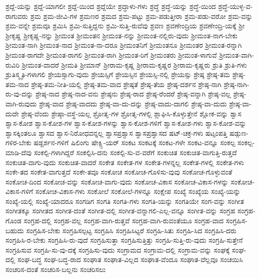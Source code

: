 {ಶ್ರದ್ದೆ-ಯನ್ನು
ಶ್ರದ್ದೆ-ಯಾಗಲೀ
ಶ್ರದ್ದೆ-ಯಿಂದ
ಶ್ರದ್ದೆಯೇ
ಶ್ರದ್ಧಾಳು-ಗಳು
ಶ್ರದ್ಧೆ
ಶ್ರದ್ಧೆ-ಯನ್ನು
ಶ್ರದ್ಧೆ-ಯಿಂದ
ಶ್ರದ್ಧೆ-ಯುಳ್ಳ-ವ-ರಾಗುವರು
ಶ್ರಮ
ಶ್ರಮ-ಜೀವಿ-ಗಳ
ಶ್ರಮಣರ
ಶ್ರಮದ
ಶ್ರಮ-ಪಟ್ಟು
ಶ್ರಮ-ಪಡುತ್ತೀರಾ
ಶ್ರಮ-ಪಡು-ವರೋ
ಶ್ರಮ-ವನ್ನು
ಶ್ರಮ-ವನ್ನೇ
ಶ್ರಮವೂ
ಶ್ರಮಿಸಿ
ಶ್ರಮಿ-ಸುತ್ತಿದ್ದನು
ಶ್ರಮಿ-ಸುತ್ತಿ-ರುವೆವು
ಶ್ರವಣ
ಶ್ರವಣೇಂದ್ರಿಯ
ಶ್ರವಣೇಂದ್ರಿ-ಯಕ್ಕೆ
ಶ್ರೀ
ಶ್ರೀಕೃಷ್ಣ
ಶ್ರೀಕೃಷ್ಣ-ನನ್ನು
ಶ್ರೀಮಂತ
ಶ್ರೀಮಂತನ
ಶ್ರೀಮಂತ-ನನ್ನು
ಶ್ರೀಮಂತ-ನಲ್ಲಿರು-ವುದು
ಶ್ರೀಮಂತ-ನಾಗ-ಬೇಕು
ಶ್ರೀಮಂತ-ನಾಗಿ
ಶ್ರೀಮಂತ-ನಾದ
ಶ್ರೀಮಂತ-ನಾ-ದರೂ
ಶ್ರೀಮಂತನಿಗೆ
ಶ್ರೀಮಂತನೂ
ಶ್ರೀಮಂತರ
ಶ್ರೀಮಂತ-ರನ್ನಾಗಿ
ಶ್ರೀಮಂತ-ರಾಗದೇ
ಶ್ರೀಮಂತ-ರಾಗಲಿ
ಶ್ರೀಮಂತ-ರಾಗಿ
ಶ್ರೀಮಂತ-ರಿಗೆ
ಶ್ರೀಮಂತರು
ಶ್ರೀಮಂತ-ಳಾಗುವೆ
ಶ್ರೀಮಂತ-ವಾಗಿ-ರುವಿರಿ
ಶ್ರೀಮಂತ-ವಾದರೆ
ಶ್ರೀಮತಿ
ಶ್ರೀಮಾನ್
ಶ್ರೀರಾಮ-ಕೃಷ್ಣ
ಶ್ರೀರಾಮ-ಕೃಷ್ಣರ
ಶ್ರೀರಾಮ-ಕೃಷ್ಣರು
ಶ್ರುತಿ
ಶ್ರುತಿ-ಗಳು
ಶ್ರುತಿಸ್ಮೃತಿ-ಗಳಾಗಲಿ
ಶ್ರೇಯಸ್ಸಾಗು-ವುದು
ಶ್ರೇಯಸ್ಸಿಗೆ
ಶ್ರೇಯಸ್ಸಿನ
ಶ್ರೇಯಸ್ಸಿ-ನಲ್ಲಿ
ಶ್ರೇಯಸ್ಸು
ಶ್ರೇಷ್ಠ
ಶ್ರೇಷ್ಠ-ತಮ
ಶ್ರೇಷ್ಠ-ತಮ-ನಾದ
ಶ್ರೇಷ್ಠ-ತಮ-ನೀತಿ-ಯಲ್ಲಿ
ಶ್ರೇಷ್ಠ-ತಮ-ವಾದ
ಶ್ರೇಷ್ಠತೆ
ಶ್ರೇಷ್ಠ-ತೆಯ
ಶ್ರೇಷ್ಠ-ದರ್ಶನ
ಶ್ರೇಷ್ಠ-ನಾಗಿ
ಶ್ರೇಷ್ಠ-ನಾಗಿ-ರು-ವು-ದನ್ನು
ಶ್ರೇಷ್ಠ-ನಾದ
ಶ್ರೇಷ್ಠ-ನಾದ-ವನು
ಶ್ರೇಷ್ಠನು
ಶ್ರೇಷ್ಠ-ರಾದ
ಶ್ರೇಷ್ಠ-ರೆಂದರೆ
ಶ್ರೇಷ್ಠ-ವನ್ನಾಗಿ
ಶ್ರೇಷ್ಠ-ವಲ್ಲ
ಶ್ರೇಷ್ಠ-ವಾಗಿ-ರುವುದು
ಶ್ರೇಷ್ಠ-ವಾದ
ಶ್ರೇಷ್ಠ-ವಾದದು
ಶ್ರೇಷ್ಠ-ವಾ-ದು-ದನ್ನು
ಶ್ರೇಷ್ಠ-ವಾದು-ದಾಗಲಿ
ಶ್ರೇಷ್ಠ-ವಾ-ದುದು
ಶ್ರೇಷ್ಠ-ವಾ-ದುದೇ
ಶ್ರೇಷ್ಠ-ವೆಂದು
ಶ್ರೇಷ್ಠಾ-ವಸ್ಥೆ-ಯಲ್ಲ
ಶ್ರೋತೃ-ಗಳ
ಶ್ರೋತೃ-ಗಳಲ್ಲಿ
ಶ್ಲಾಘಿಸಿ-ಕೊಳ್ಳುತ್ತೇನೆ
ಶ್ಲೋಕ-ವನ್ನು
ಶ್ವಾಸ
ಶ್ವಾಸ-ಕೋಶ
ಶ್ವಾಸ-ಕೋಶ-ಗಳ
ಶ್ವಾಸ-ಕೋಶ-ಗಳನ್ನು
ಶ್ವಾಸ-ಕೋಶ-ಗಳಿಗೆ
ಶ್ವಾಸ-ಕೋಶ-ಗಳು
ಶ್ವಾಸ-ಕೋಶ-ವನ್ನು
ಶ್ವಾಸಕ್ಕಿಂತಲೂ
ಶ್ವಾಸದ
ಶ್ವಾಸ-ನಿರೋಧವನ್ನಲ್ಲ
ಶ್ವಾಸಪ್ರಶ್ವಾಸ
ಶ್ವಾಸಪ್ರಶ್ವಾಸದ
ಷಟ್-ಚಕ್ರ-ಗಳು
ಷಟ್ಸಂಪತ್ತಿ
ಷಡ್ಗುಣ-ಗಳಿರ-ಬೇಕು
ಷಡ್ದರ್ಶನ-ಗಳಿಗೆ
ಷಿಲಿಂಗು
ಷೇಕ್ಸ್ಪಿ-ಯರ್
ಸಂಕಟ
ಸಂಕಟಕ್ಕೆ
ಸಂಕಟ-ಗಳೇ
ಸಂಕಟ-ವನ್ನೂ
ಸಂಕಲ್ಪ
ಸಂಕಲ್ಪ-ಮಾಡಿ-ದೆವು
ಸಂಕಲ್ಪಿ-ಗಳಾಗಿದ್ದರೆ
ಸಂಕಲ್ಪಿಸಿ-ದನು
ಸಂಕಲ್ಪಿ-ಸು-ವ-ವರೆಗೆ
ಸಂಕುಚಿತ
ಸಂಕುಚಿತ-ವಾಗುತ್ತಿ-ರುತ್ತದೆ
ಸಂಕುಚಿತ-ವಾಗು-ವುದು
ಸಂಕುಚಿತ-ವಾದರೆ
ಸಂಕೇತ
ಸಂಕೇತ-ಗಳ
ಸಂಕೇತ-ಗಳನ್ನಲ್ಲ
ಸಂಕೇತ-ಗಳಲ್ಲಿ
ಸಂಕೇತ-ಗಳು
ಸಂಕೇ-ತದ
ಸಂಕೇತ-ವಾಗುತ್ತದೆ
ಸಂಕೇ-ತವೂ
ಸಂಕೋಚ
ಸಂಕೋಚ-ಗೊಳಿಸು-ವುವು
ಸಂಕೋಚ-ಗೊಳ್ಳುವಂತೆ
ಸಂಕೋಚ-ದಿಂದ
ಸಂಕೋಚ-ವನ್ನು
ಸಂಕೋಚ-ವಾಗು-ವುದು
ಸಂಕೋಚ-ವಿಕಾಸ
ಸಂಕೋಚ-ವಿಕಾಸ-ಗಳನ್ನು
ಸಂಕೋಚ-ವಿಕಾಸ-ಗಳಿಗೆ
ಸಂಕೋಚ-ವಿಕಾಸ-ಗಳು
ಸಂಕೋಲೆ
ಸಂಕೋಲೆ-ಗಳನ್ನೂ
ಸಂಕ್ಷೇಪ
ಸಂಖ್ಯೆ
ಸಂಖ್ಯೆಯ
ಸಂಖ್ಯೆ-ಯನ್ನು
ಸಂಖ್ಯೆ-ಯಲ್ಲಿ
ಸಂಖ್ಯೆ-ಯಾದರೂ
ಸಂಗಡಿಗ
ಸಂಗತಿ
ಸಂಗತಿ-ಗಳು
ಸಂಗತಿ-ಯನ್ನು
ಸಂಗತಿಯೇ
ಸಂಗ-ವನ್ನು
ಸಂಗೀತ
ಸಂಗೀತಕ್ಕೂ
ಸಂಗೀತದ
ಸಂಗೀತ-ದಂತೆ
ಸಂಗೀತ-ದಲ್ಲಿ
ಸಂಗೀತ-ವನ್ನಾಗಲಿ-ಎಲ್ಲ-ವನ್ನೂ
ಸಂಗೀತ-ವನ್ನು
ಸಂಗ್ರಹ
ಸಂಗ್ರಹ-ಗೊಂಡ
ಸಂಗ್ರಹ-ದಲ್ಲಿ
ಸಂಗ್ರಹ-ವಲ್ಲ
ಸಂಗ್ರಹ-ವಾಗಿ-ರುತ್ತವೆ
ಸಂಗ್ರಹ-ವಾಗಿ-ರುವಂತೆಯೂ
ಸಂಗ್ರಹ-ವಾದ
ಸಂಗ್ರಹಿಸ-ಬಹುದು
ಸಂಗ್ರಹಿಸ-ಬೇಕು
ಸಂಗ್ರಹಿಸಲ್ಪಟ್ಟ
ಸಂಗ್ರಹಿಸಿ
ಸಂಗ್ರಹಿಸಿಟ್ಟರೆ
ಸಂಗ್ರಹಿ-ಸಿತು
ಸಂಗ್ರಹಿ-ಸಿದ
ಸಂಗ್ರಹಿಸಿ-ದರು
ಸಂಗ್ರಹಿಸಿ-ರ-ಬೇಕು
ಸಂಗ್ರಹಿಸಿ-ರು-ವುದೆ
ಸಂಗ್ರಹಿಸುತ್ತಾ
ಸಂಗ್ರಹಿಸುತ್ತಿತ್ತು
ಸಂಗ್ರಹಿ-ಸುತ್ತಿ-ರು-ವುದು
ಸಂಗ್ರಹಿ-ಸುತ್ತೇನೆ
ಸಂಗ್ರಹಿಸುವ
ಸಂಗ್ರಹಿ-ಸು-ವು-ದಕ್ಕೆ
ಸಂಗ್ರಹಿಸು-ವುದು
ಸಂಗ್ರಾಮದ
ಸಂಗ್ರಾಮ-ದಲ್ಲಿ
ಸಂಗ್ರಾಮ-ವನ್ನು
ಸಂಘಕ್ಕೆ
ಸಂಘ-ದಲ್ಲಿ
ಸಂಘ-ಬದ್ಧ
ಸಂಘ-ಬದ್ಧ-ರಾದ
ಸಂಘಾತ
ಸಂಘಾತ-ವಿಲ್ಲದ
ಸಂಘಾತ-ವೆಂದೂ
ಸಂಘಾತ-ವೆಲ್ಲವೂ
ಸಂಚಯಿಸಿ
ಸಂಚರಿಸ-ದಂತೆ
ಸಂಚರಿಸ-ಬಲ್ಲನು
ಸಂಚರಿಸಲು
}
